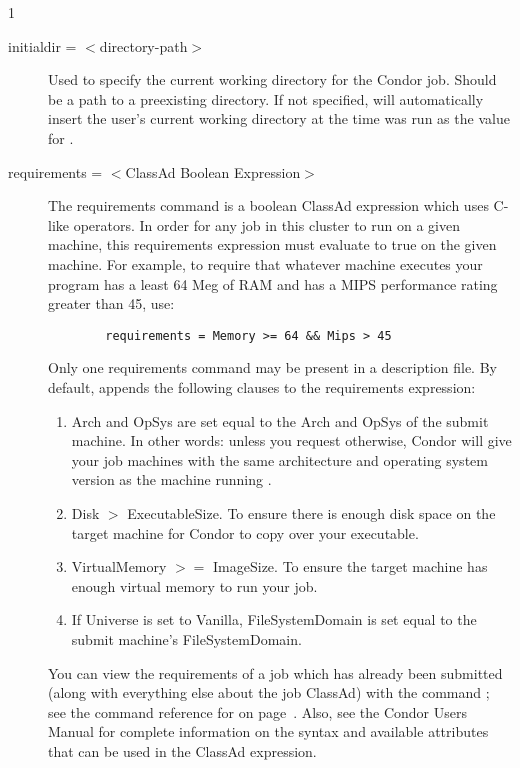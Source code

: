 \begin{ManPage}{\label{man-condor-submit}}{1}
\begin{description}

\item[initialdir = $<$directory-path$>$] Used to specify the current
working directory for the Condor job. Should be a path to a preexisting
directory. If not specified,  will automatically insert
the user's current working directory at the time  was run
as the value for . 



\item[requirements = $<$ClassAd Boolean Expression$>$] The requirements
command is a boolean ClassAd expression which uses C-like operators. In
order for any job in this cluster to run on a given machine, this
requirements expression must evaluate to true on the given machine. For
example, to require that whatever machine executes your program has a
least 64 Meg of RAM and has a MIPS performance rating greater than 45,
use: 
\begin{verbatim}
        requirements = Memory >= 64 && Mips > 45
\end{verbatim}
Only one requirements command may be present in a
description file. By default,  
appends the following clauses to the requirements expression:
\begin{enumerate}
	\item Arch and OpSys are set equal to the Arch and OpSys of the
submit machine.  In other words: unless you request otherwise, Condor will give your
job machines with the same architecture and operating system version as
the machine running .
	\item Disk $>$ ExecutableSize.  To ensure there is enough disk space on the 
target machine for Condor to copy over your executable.
	\item VirtualMemory $>=$ ImageSize.  To ensure the target machine
has enough virtual memory to run your job.
	\item If Universe is set to Vanilla, FileSystemDomain is set equal to
the submit machine's FileSystemDomain.
\end{enumerate}
You can view the requirements of a job
which has already been submitted (along with everything else about the
job ClassAd) with the command ; see the command reference for
 on page~\pageref{man-condor-q}.  Also, see the Condor Users
Manual for complete information on the syntax and available attributes
that can be used in the ClassAd expression.


\end{description}
\end{ManPage}
